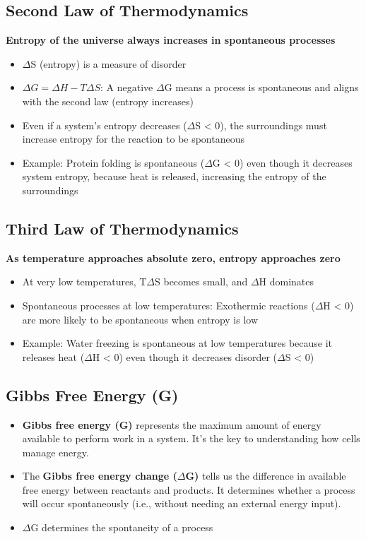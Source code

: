 \documentclass[10pt]{article}
\begin{document}
\subsection*{Second Law of Thermodynamics}
\textbf{Entropy of the universe always increases in spontaneous processes}
\begin{itemize}
    \item $\Delta$S (entropy) is a measure of disorder
    \item $\Delta G = \Delta H - T\Delta S$: A negative $\Delta$G means a process is spontaneous and aligns with the second law (entropy increases)
    \item Even if a system's entropy decreases ($\Delta$S < 0), the surroundings must increase entropy for the reaction to be spontaneous
    \item Example: Protein folding is spontaneous ($\Delta$G < 0) even though it decreases system entropy, because heat is released, increasing the entropy of the surroundings
\end{itemize}

\subsection*{Third Law of Thermodynamics}
\textbf{As temperature approaches absolute zero, entropy approaches zero}
\begin{itemize}
    \item At very low temperatures, T$\Delta$S becomes small, and $\Delta$H dominates
    \item Spontaneous processes at low temperatures: Exothermic reactions ($\Delta$H < 0) are more likely to be spontaneous when entropy is low
    \item Example: Water freezing is spontaneous at low temperatures because it releases heat ($\Delta$H < 0) even though it decreases disorder ($\Delta$S < 0)
\end{itemize}

\subsection*{Gibbs Free Energy (G)}
\begin{itemize}
    \item \textbf{Gibbs free energy (G)} represents the maximum amount of energy available to perform work in a system. It's the key to understanding how cells manage energy.
    \item The \textbf{Gibbs free energy change ($\Delta$G)} tells us the difference in available free energy between reactants and products. It determines whether a process will occur spontaneously (i.e., without needing an external energy input).
    \item $\Delta$G determines the spontaneity of a process
\end{itemize}
\end{document}
